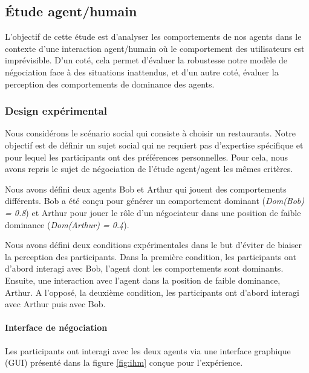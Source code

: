 {		\subsection{Étude agent/humain}
		
					L'objectif de cette étude est d'analyser les comportements de nos agents dans le contexte d'une interaction agent/humain où le comportement des utilisateurs est imprévisible. D'un coté, cela permet d'évaluer la robustesse notre modèle de négociation face à des situations inattendus, et d'un autre coté, évaluer la perception des comportements de dominance des agents. 
					
					
				\subsubsection{Design expérimental}
				
				Nous considérons le scénario social qui consiste à choisir un restaurants. Notre objectif est de définir un sujet social qui ne requiert pas d'expertise spécifique et pour lequel les participants ont des préférences personnelles. Pour cela, nous avons repris le sujet de négociation de l'étude agent/agent les mêmes critères.
					
				Nous avons défini deux agents Bob et Arthur qui jouent des comportements différents. Bob a été conçu pour générer un comportement dominant (\textit{Dom(Bob) = 0.8}) et Arthur pour jouer le rôle d'un négociateur dans une position de faible dominance (\textit{Dom(Arthur) = 0.4}).
			
					
				Nous avons défini deux conditions expérimentales dans le but d'éviter de biaiser la perception des participants. Dans la première condition, les participants ont d'abord interagi avec Bob, l'agent dont les comportements sont dominants. Ensuite, une interaction avec l'agent dans la position de faible dominance, Arthur.
				A l'opposé, la deuxième condition, les participants ont d'abord interagi  avec Arthur puis avec Bob.
				
				\paragraph{Interface de négociation}			
					Les participants ont interagi avec les deux agents via une interface graphique (GUI) présenté dans la figure \ref{fig:ihm} conçue pour l'expérience. 
					
}

